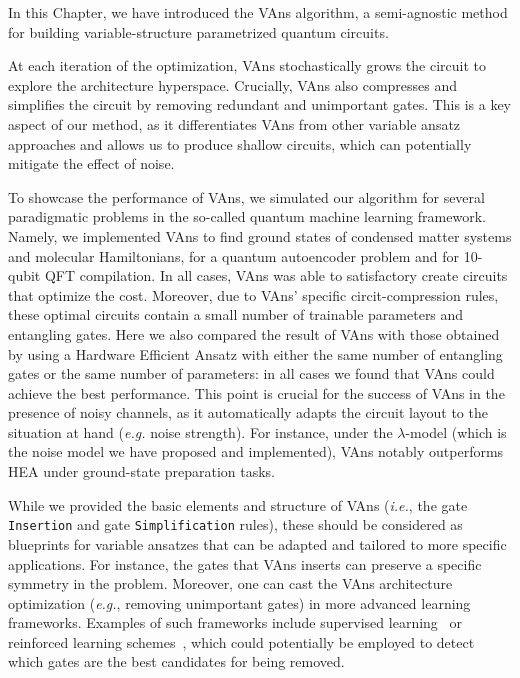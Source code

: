 In this Chapter, we have introduced the VAns algorithm, a semi-agnostic method for building variable-structure parametrized quantum circuits.

At each iteration of the optimization, VAns stochastically grows the circuit to explore the architecture hyperspace. Crucially, VAns also compresses and simplifies the circuit by removing redundant and unimportant gates. This is a key aspect of our method, as it differentiates VAns from other variable ansatz approaches and allows us to produce shallow circuits, which can potentially mitigate the effect of noise.

To showcase the performance of VAns, we simulated our algorithm for several paradigmatic problems in the so-called quantum machine learning framework. Namely, we implemented VAns to find ground states of condensed matter systems and molecular Hamiltonians, for a quantum autoencoder problem and for 10-qubit QFT compilation. In all cases, VAns was able to satisfactory create circuits that optimize the cost. Moreover, due to VAns' specific circit-compression rules, these optimal circuits contain a small number of trainable parameters and entangling gates. Here we also compared the result of VAns with those obtained by using a Hardware Efficient Ansatz with either the same number of entangling gates or the same number of parameters: in all cases we found that VAns could achieve the best performance. This point is crucial for the success of VAns in the presence of noisy channels, as it automatically adapts the circuit layout to the situation at hand (\textit{e.g.} noise strength). For instance, under the $\lambda$-model (which is the noise model we have proposed and implemented), VAns notably outperforms HEA under ground-state preparation tasks.

While we provided the basic elements and structure of VAns (\textit{i.e.}, the gate \texttt{Insertion} and gate \texttt{Simplification}  rules), these should be considered as blueprints for variable ansatzes that can be adapted and tailored to more specific applications. For instance, the gates that VAns inserts can preserve a specific symmetry in the problem. Moreover, one can cast the VAns architecture optimization (\textit{e.g.}, removing unimportant gates) in more advanced learning frameworks. Examples of such frameworks include supervised learning~\cite{supercomi} or reinforced learning schemes~\cite{foselgoogleRL,Moro2021,HerreraMarti2022policygradient}, which could potentially be employed to detect which gates are the best candidates for being removed.


